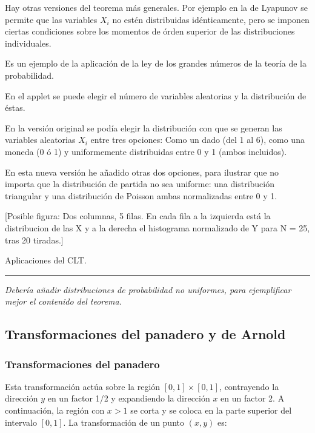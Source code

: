 \documentclass[11pt, a4paper]{article} %
\theoremstyle{named}
\begin{document}
        Hay otras versiones del teorema más generales. Por ejemplo en la de Lyapunov se permite que las variables $X_i$ no estén distribuidas idénticamente, pero se imponen ciertas condiciones sobre los momentos de órden superior de las distribuciones individuales.

        Es un ejemplo de la aplicación de la ley de los grandes números de la teoría de la probabilidad.

        En el applet se puede elegir el número de variables aleatorias y la distribución de éstas.

        En la versión original se podía elegir la distribución con que se generan las variables aleatorias $X_i$ entre tres opciones: Como un dado (del 1 al 6), como una moneda (0 ó 1) y uniformemente distribuidas entre 0 y 1 (ambos incluidos).

        En esta nueva versión he añadido otras dos opciones, para ilustrar que no importa que la distribución de partida no sea uniforme: una distribución triangular y una distribución de Poisson ambas normalizadas entre 0 y 1.

        [Posible figura: Dos columnas, 5 filas. En cada fila a la izquierda está la distribucion de las X y a la derecha el histograma normalizado de Y para N = 25, tras 20 tiradas.]

        Aplicaciones del CLT.

        \noindent\rule{\linewidth}{0.4pt}

        \textit{Debería añadir distribuciones de probabilidad no uniformes, para ejemplificar mejor el contenido del teorema.}

    \newpage
    \subsection{Transformaciones del panadero y de Arnold}\label{sec:transformations}

        \subsubsection{Transformaciones del panadero}\label{sec:panadero}

            Esta transformación actúa sobre la región $[0,1] \times [0,1]$, contrayendo la dirección $y$ en un factor 1/2 y expandiendo la dirección $x$ en un factor 2. A continuación, la región con $x >1$ se corta y se coloca en la parte superior del intervalo $[0,1]$. La transformación de un punto $(x,y)$ es:
\end{document}
